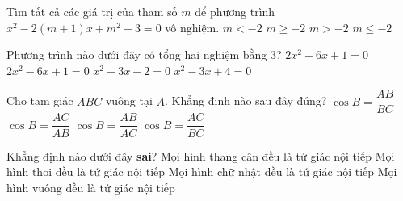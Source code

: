 \begin{ex}%
Tìm tất cả các giá trị của tham số $ m $ để phương trình $ x^{2}-2(m+1)x+m^{2}-3=0 $ vô nghiệm.
\choice
{\True $ m<-2 $}
{$ m\geq -2 $}
{$ m> -2 $}
{$ m\leq -2 $}
\end{ex}
\begin{ex}%
Phương trình nào dưới đây có tổng hai nghiệm bằng $ 3 $?
\choice
{$ 2x^{2}+6x+1=0 $}
{\True $ 2x^{2}-6x+1=0 $}
{$ x^{2}+3x-2=0 $}
{$ x^{2}-3x+4=0 $}
\end{ex}
\begin{ex}%
Cho tam giác $ ABC $ vuông tại $ A $. Khẳng định nào sau đây đúng?
\choice
{\True $ \cos B=\dfrac{AB}{BC} $}
{$ \cos B=\dfrac{AC}{AB} $}
{$ \cos B=\dfrac{AB}{AC} $}
{$ \cos B=\dfrac{AC}{BC} $}
\end{ex}
\begin{ex}%
Khẳng định nào dưới đây \textbf{sai}?
\choice
{Mọi hình thang cân đều là tứ giác nội tiếp}
{\True Mọi hình thoi đều là tứ giác nội tiếp}
{Mọi hình chữ nhật đều là tứ giác nội tiếp}
{Mọi hình vuông đều là tứ giác nội tiếp}
\end{ex}
